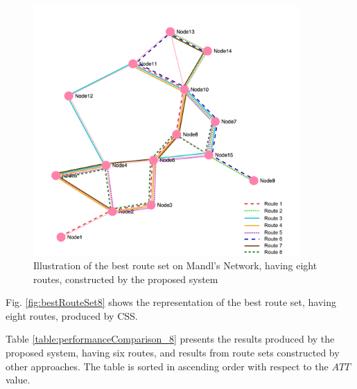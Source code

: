 \begin{figure}[H]
    \begin{center}
    \includegraphics[width=4in]{assets/mandlnetwork_8routes.png}
    \end{center}
    \caption{Illustration of the best route set on Mandl's Network, having eight routes, constructed by the proposed system}
    \label{fig:bestRouteSet8} 
\end{figure}

Fig. \vref{fig:bestRouteSet8} shows the representation of the best route set, having eight routes, produced by CSS.

Table \vref{table:performanceComparison_8} presents the results produced by the proposed system, having six routes, and results from route sets constructed by other approaches. The table is sorted in ascending order with respect to the $ATT$ value.

